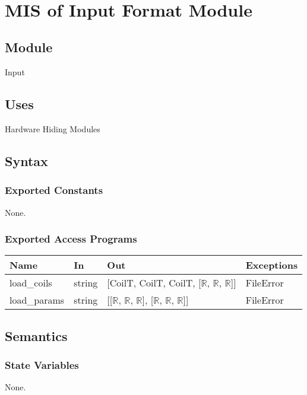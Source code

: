 \documentclass[12pt, titlepage]{article}
\begin{document}
\newpage
~\newpage

\section{MIS of Input Format Module} \label{MIF}

\subsection{Module}
Input

\subsection{Uses}
Hardware Hiding Modules

\subsection{Syntax}

\subsubsection{Exported Constants}
None.
\subsubsection{Exported Access Programs}

\begin{center}
\begin{tabular}{p{3cm} p{3cm} p{4cm} p{2cm}}
\hline
\textbf{Name} & \textbf{In} & \textbf{Out} & \textbf{Exceptions} \\
\hline
load\_coils & string & [CoilT, CoilT, CoilT, [$\mathbb{R}$, $\mathbb{R}$, $\mathbb{R}$]] & FileError  \\
\hline
load\_params & string & [[$\mathbb{R}$, $\mathbb{R}$, $\mathbb{R}$], [$\mathbb{R}$, $\mathbb{R}$, $\mathbb{R}$]]  & FileError  \\
\hline
\end{tabular}
\end{center}

\subsection{Semantics}

\subsubsection{State Variables}
None.
\end{document}
